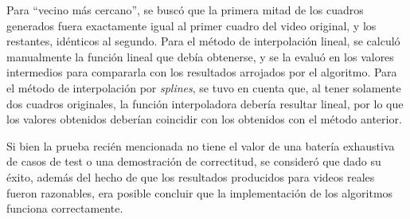     Para ``vecino más cercano'', se buscó que la primera mitad de los cuadros generados fuera exactamente igual al primer cuadro del video original, y los restantes, idénticos al segundo. Para el método de interpolación lineal, se calculó manualmente la función lineal que debía obtenerse, y se la evaluó en los valores intermedios para compararla con los resultados arrojados por el algoritmo. Para el método de interpolación por \emph{splines}, se tuvo en cuenta que, al tener solamente dos cuadros originales, la función interpoladora debería resultar lineal, por lo que los valores obtenidos deberían coincidir con los obtenidos con el método anterior.

    Si bien la prueba recién mencionada no tiene el valor de una batería exhaustiva de casos de test o una demostración de correctitud, se consideró que dado su éxito, además del hecho de que los resultados producidos para videos reales fueron razonables, era posible concluir que la implementación de los algoritmos funciona correctamente.
